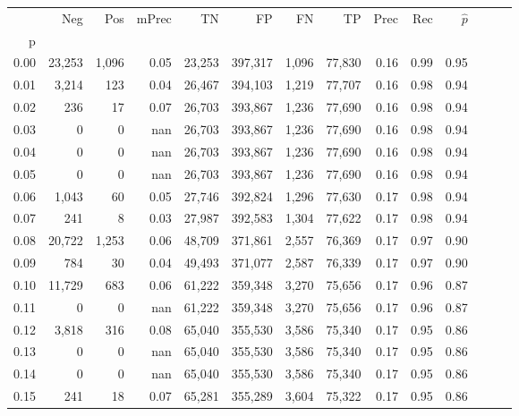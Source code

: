 \begin{tabular}{rrrrrrrrrrrrrr}
\toprule
{} &     Neg &    Pos & mPrec &       TN &       FP &      FN &      TP &  Prec &   Rec & $\hat{p}$ \\
p    &         &        &       &          &          &         &         &       &       &           \\
\midrule
0.00 &  23,253 &  1,096 &  0.05 &   23,253 &  397,317 &   1,096 &  77,830 &  0.16 &  0.99 &      0.95 \\
0.01 &   3,214 &    123 &  0.04 &   26,467 &  394,103 &   1,219 &  77,707 &  0.16 &  0.98 &      0.94 \\
0.02 &     236 &     17 &  0.07 &   26,703 &  393,867 &   1,236 &  77,690 &  0.16 &  0.98 &      0.94 \\
0.03 &       0 &      0 &   nan &   26,703 &  393,867 &   1,236 &  77,690 &  0.16 &  0.98 &      0.94 \\
0.04 &       0 &      0 &   nan &   26,703 &  393,867 &   1,236 &  77,690 &  0.16 &  0.98 &      0.94 \\
0.05 &       0 &      0 &   nan &   26,703 &  393,867 &   1,236 &  77,690 &  0.16 &  0.98 &      0.94 \\
0.06 &   1,043 &     60 &  0.05 &   27,746 &  392,824 &   1,296 &  77,630 &  0.17 &  0.98 &      0.94 \\
0.07 &     241 &      8 &  0.03 &   27,987 &  392,583 &   1,304 &  77,622 &  0.17 &  0.98 &      0.94 \\
0.08 &  20,722 &  1,253 &  0.06 &   48,709 &  371,861 &   2,557 &  76,369 &  0.17 &  0.97 &      0.90 \\
0.09 &     784 &     30 &  0.04 &   49,493 &  371,077 &   2,587 &  76,339 &  0.17 &  0.97 &      0.90 \\
0.10 &  11,729 &    683 &  0.06 &   61,222 &  359,348 &   3,270 &  75,656 &  0.17 &  0.96 &      0.87 \\
0.11 &       0 &      0 &   nan &   61,222 &  359,348 &   3,270 &  75,656 &  0.17 &  0.96 &      0.87 \\
0.12 &   3,818 &    316 &  0.08 &   65,040 &  355,530 &   3,586 &  75,340 &  0.17 &  0.95 &      0.86 \\
0.13 &       0 &      0 &   nan &   65,040 &  355,530 &   3,586 &  75,340 &  0.17 &  0.95 &      0.86 \\
0.14 &       0 &      0 &   nan &   65,040 &  355,530 &   3,586 &  75,340 &  0.17 &  0.95 &      0.86 \\
0.15 &     241 &     18 &  0.07 &   65,281 &  355,289 &   3,604 &  75,322 &  0.17 &  0.95 &      0.86 \\

\end{tabular}
